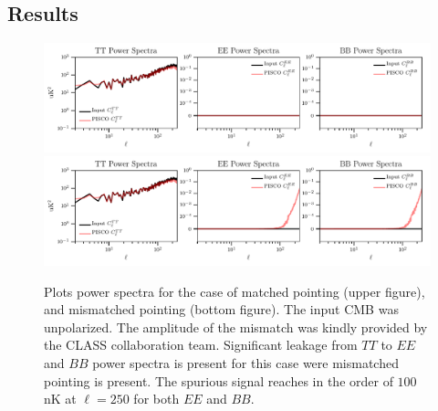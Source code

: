 \documentclass[a4paper,11pt]{article}
\begin{document}
\subsection{Results}

\begin{figure}[!htb]
	\centering
	\includegraphics[width=1\textwidth]{figures/unpolCMB_r0d00_CLASS_matchedPointing_matchedBeams_ellipticalBeams.pdf}
	\includegraphics[width=1\textwidth]{figures/unpolCMB_r0d00_CLASS_mismatchedPointing_matchedBeams_ellipticalBeams.pdf}
	\caption{Plots power spectra for the case of matched pointing (upper figure), and mismatched pointing (bottom figure). The input CMB was unpolarized. The amplitude of the mismatch was kindly provided by the CLASS collaboration team. Significant leakage from $TT$ to $EE$ and $BB$ power spectra is present for this case were mismatched pointing is present. The spurious signal reaches in the order of $100$ nK at $\ell = 250$ for both $EE$ and $BB$.}
	\label{fig::pisco4class_pointingmismatch}
\end{figure}
\end{document}
